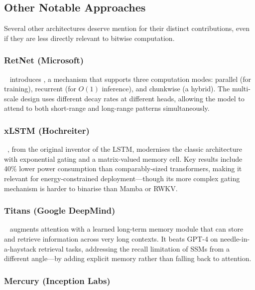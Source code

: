 \subsection{Other Notable Approaches}
\label{sec:other-alt-archs}

Several other architectures deserve mention for their distinct
contributions, even if they are less directly relevant to bitwise
computation.

\subsubsection{RetNet (Microsoft)}

~\cite{sun2023retnet} introduces , a mechanism that supports three computation modes:
parallel (for training), recurrent (for $O(1)$ inference), and
chunkwise (a hybrid). The multi-scale design uses different decay
rates at different heads, allowing the model to attend to both
short-range and long-range patterns simultaneously.

\subsubsection{xLSTM (Hochreiter)}

~\cite{beck2024xlstm}, from the original inventor of
the LSTM, modernises the classic architecture with exponential gating
and a matrix-valued memory cell. Key results include 40\% lower power
consumption than comparably-sized transformers, making it relevant for
energy-constrained deployment---though its more complex gating
mechanism is harder to binarise than Mamba or RWKV.

\subsubsection{Titans (Google DeepMind)}

~\cite{behrouz2025titans} augments attention with a
learned long-term memory module that can store and retrieve
information across very long contexts. It beats GPT-4 on
needle-in-a-haystack retrieval tasks, addressing the recall
limitation of SSMs from a different angle---by adding explicit
memory rather than falling back to attention.

\subsubsection{Mercury (Inception Labs)}


